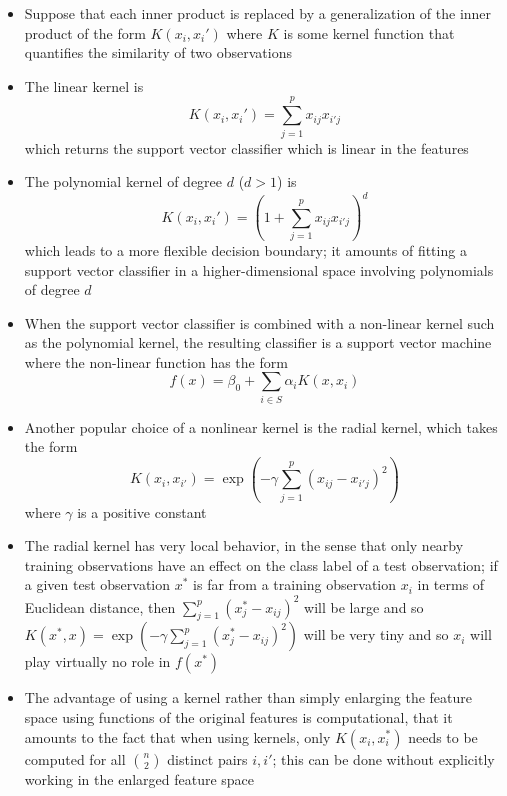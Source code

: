 \documentclass[12pt]{article}
\begin{document}
\begin{itemize}
\item Suppose that each inner product is replaced by a generalization of the inner product of the form $K(x_i, x_i')$ where $K$ is some kernel function that quantifies the similarity of two observations 
\item The linear kernel is $$ K(x_i, x_i') = \sum_{j=1}^p x_{ij}x_{i'j} $$ which returns the support vector classifier which is linear in the features 
\item The polynomial kernel of degree $d$ ($d > 1$) is $$ K(x_i, x_i') = \left( 1 + \sum_{j=1}^p x_{ij}x_{i'j}\right)^d $$ which leads to a more flexible decision boundary; it amounts of fitting a support vector classifier in a higher-dimensional space involving polynomials of degree $d$ 
\item When the support vector classifier is combined with a non-linear kernel such as the polynomial kernel, the resulting classifier is a support vector machine where the non-linear function has the form $$ f(x) = \beta_0 + \sum_{i\in S} \alpha_i K(x, x_i) $$ 
\item Another popular choice of a nonlinear kernel is the radial kernel, which takes the form 
$$K(x_i, x_{i'}) = \exp\left( -\gamma \sum_{j=1}^p (x_{ij} - x_{i'j})^2 \right) $$ where $\gamma$ is a positive constant 
\item The radial kernel has very local behavior, in the sense that only nearby training observations have an effect on the class label of a test observation; if a given test observation $x^\ast$ is far from a training observation $x_i$ in terms of Euclidean distance, then $\sum_{j=1}^p (x_j^\ast - x_{ij})^2$ will be large and so $K(x^\ast,x) = \exp(-\gamma \sum_{j=1}^p (x_j^\ast- x_{ij})^2)$ will be very tiny and so $x_i$ will play virtually no role in $f(x^\ast)$
\item The advantage of using a kernel rather than simply enlarging the feature space using functions of the original features is computational, that it amounts to the fact that when using kernels, only $K(x_i, x_i^\ast)$ needs to be computed for all $\binom{n}{2}$ distinct pairs $i,i'$; this can be done without explicitly working in the enlarged feature space 
\end{itemize} 
\end{document}
